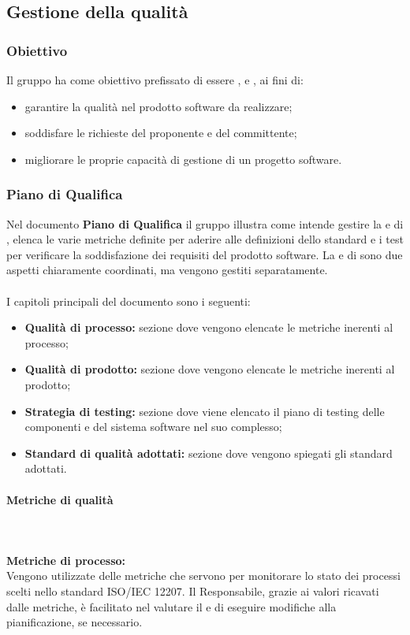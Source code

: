 \subsection{Gestione della qualità}
\subsubsection{Obiettivo}
Il gruppo \Gruppo ha come obiettivo prefissato di essere ,  e , ai fini di:
\begin{itemize}
    \item garantire la qualità nel prodotto software da realizzare;
    \item soddisfare le richieste del proponente e del committente;
    \item migliorare le proprie capacità di gestione di un progetto software.
\end{itemize}

\subsubsection{Piano di Qualifica}
Nel documento \textbf{Piano di Qualifica} il gruppo \Gruppo illustra come intende gestire la  e di , elenca le varie metriche definite per aderire alle definizioni dello standard e i test per verificare la soddisfazione dei requisiti del prodotto software.
La  e di  sono due aspetti chiaramente coordinati, ma vengono gestiti separatamente. \\ \\
I capitoli principali del documento sono i seguenti:
\begin{itemize}
    \item \textbf{Qualità di processo:} sezione dove vengono elencate le metriche inerenti al processo;
    \item \textbf{Qualità di prodotto:} sezione dove vengono elencate le metriche inerenti al prodotto;
    \item \textbf{Strategia di testing:} sezione dove viene elencato il piano di testing delle componenti e del sistema software nel suo complesso;
    \item \textbf{Standard di qualità adottati:} sezione dove vengono spiegati gli standard adottati.
\end{itemize}

\paragraph{Metriche di qualità}\mbox{}\\ \\
\textbf{Metriche di processo:}\\
Vengono utilizzate delle metriche che servono per monitorare lo stato dei processi scelti nello standard ISO/IEC 12207. Il Responsabile, grazie ai valori ricavati dalle metriche, è facilitato nel
valutare il  e di eseguire modifiche alla pianificazione, se necessario.\\

